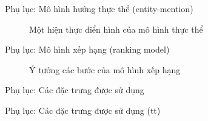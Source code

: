 \documentclass[9pt,xcolor=table,hyperref=unicode]{beamer}
\begin{document}
		\begin{frame}{Phụ lục: Mô hình hướng thực thể (entity-mention)}
			\begin{figure}[H]
				\centering
				\scalebox{.8}{}
				\caption{Một hiện thực điển hình của mô hình thực thể}
				\label{fig:entitymention}
			\end{figure}
		\end{frame}

		\begin{frame}{Phụ lục: Mô hình xếp hạng (ranking model)}
			\begin{figure}[H]
				\centering
				\scalebox{.8}{}
				\caption{Ý tưởng các bước của mô hình xếp hạng}
				\label{fig:rankingmodel}
			\end{figure}
		\end{frame}

		\begin{frame}{Phụ lục: Các đặc trưng được sử dụng}		
			\begin{table}[]		
			\parbox{\textwidth}{
				\centering			
				\fontsize{6pt}{7}\selectfont		
					
				\caption{Các đặc trưng được sử dụng trong hệ thống}
			}
			\end{table}
		\end{frame}	

		\begin{frame}{Phụ lục: Các đặc trưng được sử dụng (tt)}				
			\begin{table}[]		
			\parbox{\textwidth}{
				\centering
				\fontsize{6pt}{7}\selectfont			
					
				\caption{Các đặc trưng được sử dụng trong hệ thống (tt)}
			}
			\end{table}		
		\end{frame}
\end{document}
